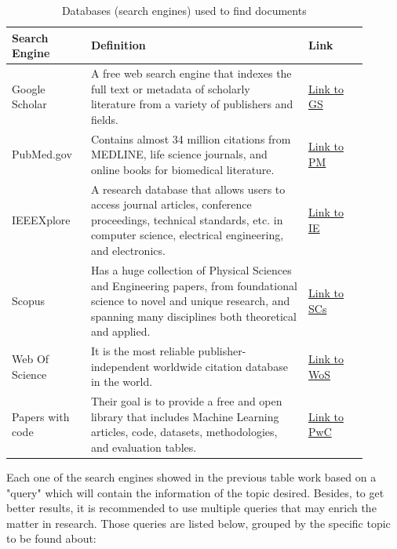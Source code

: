 \begin{table}[H]
\begin{center}
\begin{tabular}{||p{0.2\linewidth} || p{0.55\linewidth} | p{0.15\linewidth}||}
 \hline
\textbf{Search Engine} & \textbf{Definition} & \textbf{Link} \\ [0.4ex] 
 \hline\hline
Google Scholar & A free web search engine that indexes the full text or metadata of scholarly literature from a variety of publishers and fields. & \href{https://scholar.google.com/}{Link to GS} \\
\hline
PubMed.gov & Contains almost 34 million citations from MEDLINE, life science journals, and online books for biomedical literature. & \href{https://pubmed.ncbi.nlm.nih.gov/}{Link to PM} \\
\hline
IEEEXplore & A research database that allows users to access journal articles, conference proceedings, technical standards, etc. in computer science, electrical engineering, and electronics. & \href{https://ieeexplore.ieee.org/Xplore/home.jsp}{Link to IE} \\
\hline
Scopus & Has a huge collection of Physical Sciences and Engineering papers, from foundational science to novel and unique research, and spanning many disciplines both theoretical and applied. & \href{https://www.sciencedirect.com/}{Link to SCs} \\
\hline
Web Of Science & It is the most reliable publisher-independent worldwide citation database in the world. & \href{https://clarivate.com/webofsciencegroup/solutions/web-of-science/}{Link to WoS} \\
\hline
Papers with code & Their goal is to provide a free and open library that includes Machine Learning articles, code, datasets, methodologies, and evaluation tables. & \href{https://paperswithcode.com/}{Link to PwC} \\
\hline\hline
\end{tabular}
\end{center}
\caption{Databases (search engines) used to find documents}
\label{table:dbs_sr}
\end{table}

Each one of the search engines showed in the previous table work based on a "query" which will contain the information of the topic desired. Besides, to get better results, it is recommended to use multiple queries that may enrich the matter in research. Those queries are listed below, grouped by the specific topic to be found about:

